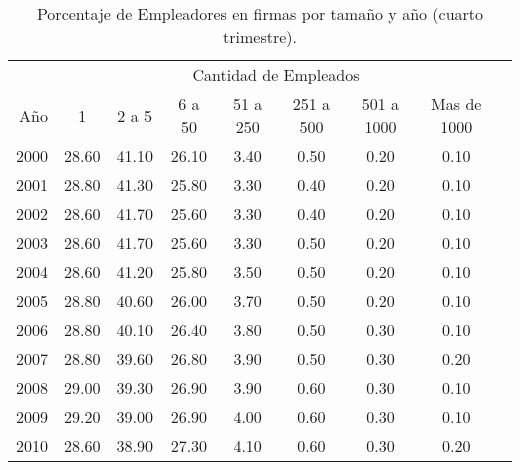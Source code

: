 \begin{table}[H]
\centering
\caption{Porcentaje de Empleadores en firmas por tamaño y año (cuarto trimestre).} 
\begin{tabular}{rcccccccc}
  \toprule
  &\multicolumn{7}{c}{Cantidad de Empleados}\\ \cline{2-8}
  A\~no & 1  & 2 a 5  & 6 a 50  & 51 a 250  & 251 a 500  & 501 a 1000  & Mas de 1000  \\ 
  \midrule 2000 & 28.60 & 41.10 & 26.10 & 3.40 & 0.50 & 0.20 & 0.10 \\ 
  2001 & 28.80 & 41.30 & 25.80 & 3.30 & 0.40 & 0.20 & 0.10 \\ 
  2002 & 28.60 & 41.70 & 25.60 & 3.30 & 0.40 & 0.20 & 0.10 \\ 
  2003 & 28.60 & 41.70 & 25.60 & 3.30 & 0.50 & 0.20 & 0.10 \\ 
  2004 & 28.60 & 41.20 & 25.80 & 3.50 & 0.50 & 0.20 & 0.10 \\ 
  2005 & 28.80 & 40.60 & 26.00 & 3.70 & 0.50 & 0.20 & 0.10 \\ 
  2006 & 28.80 & 40.10 & 26.40 & 3.80 & 0.50 & 0.30 & 0.10 \\ 
  2007 & 28.80 & 39.60 & 26.80 & 3.90 & 0.50 & 0.30 & 0.20 \\ 
  2008 & 29.00 & 39.30 & 26.90 & 3.90 & 0.60 & 0.30 & 0.10 \\ 
   2009 & 29.20 & 39.00 & 26.90 & 4.00 & 0.60 & 0.30 & 0.10 \\ 
   2010 & 28.60 & 38.90 & 27.30 & 4.10 & 0.60 & 0.30 & 0.20 \\ 
   \bottomrule
\end{tabular}
\end{table}

